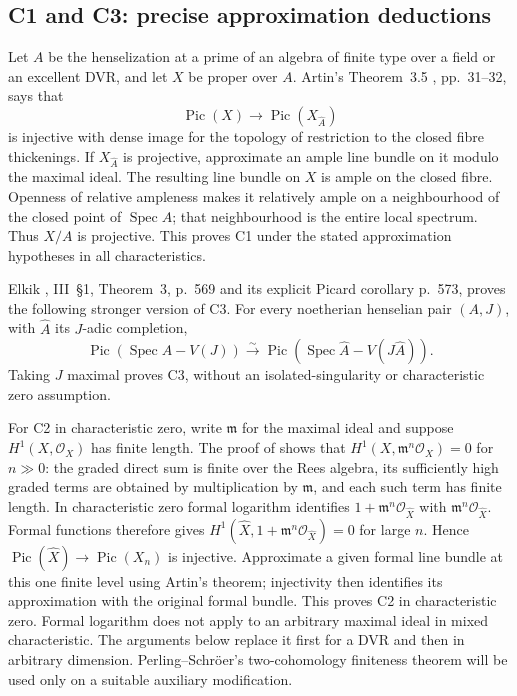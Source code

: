 \subsection{C1 and C3: precise approximation deductions}

Let $A$ be the henselization at a prime of an algebra of finite type over a
field or an excellent DVR, and let $X$ be proper over $A$.
Artin's Theorem~3.5 \cite{Artin1969}, pp.~31--32, says that
\[
 \operatorname{Pic}(X)\longrightarrow\operatorname{Pic}(X_{\widehat A})
\]
is injective with dense image for the topology of restriction to the closed
fibre thickenings. If $X_{\widehat A}$ is projective, approximate an ample
line bundle on it modulo the maximal ideal. The resulting line bundle on
$X$ is ample on the closed fibre. Openness of relative ampleness makes it
relatively ample on a neighbourhood of the closed point of $\operatorname{Spec}A$;
that neighbourhood is the entire local spectrum. Thus $X/A$ is projective.
This proves C1 under the stated approximation hypotheses in all characteristics.

Elkik \cite{Elkik1973}, III~\S1, Theorem~3, p.~569 and its explicit Picard
corollary p.~573, proves the following stronger version of C3. For every
noetherian henselian pair $(A,J)$, with $\widehat A$ its $J$-adic completion,
\[
 \operatorname{Pic}(\operatorname{Spec}A-V(J))
 \xrightarrow{\sim}
 \operatorname{Pic}(\operatorname{Spec}\widehat A-V(J\widehat A)).
\tag{C.1}
\]
Taking $J$ maximal proves C3, without an isolated-singularity or characteristic
zero assumption.

For C2 in characteristic zero, write $\mathfrak m$ for the maximal ideal and
suppose $H^1(X,\mathcal O_X)$ has finite length. The proof of
\cite[Proposition~1.2]{PerlingSchroer2017} shows that
$H^1(X,\mathfrak m^n\mathcal O_X)=0$ for $n\gg0$: the graded direct sum is
finite over the Rees algebra, its sufficiently high graded terms are obtained
by multiplication by $\mathfrak m$, and each such term has finite length.
In characteristic zero formal logarithm identifies
$1+\mathfrak m^n\mathcal O_{\widehat X}$ with
$\mathfrak m^n\mathcal O_{\widehat X}$. Formal functions therefore gives
$H^1(\widehat X,1+\mathfrak m^n\mathcal O_{\widehat X})=0$ for large $n$.
Hence $\operatorname{Pic}(\widehat X)\to\operatorname{Pic}(X_n)$ is injective.
Approximate a given formal line bundle at this one finite level using Artin's
theorem; injectivity then identifies its approximation with the original
formal bundle. This proves C2 in characteristic zero.
Formal logarithm does not apply to an arbitrary maximal ideal in mixed
characteristic. The arguments below replace it first for a DVR and then
in arbitrary dimension. Perling--Schr\"oer's two-cohomology finiteness
theorem will be used only on a suitable auxiliary modification.

